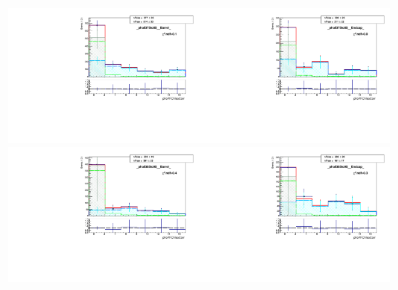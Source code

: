 \begin{figure}[htb]
  \begin{center}
   \includegraphics[width=0.45\textwidth]{../figs/figs_v11/MUON_WGamma/MCclosureWjetsPlusWg/c_TEMPL_CHISO_UNblind__phoEt75to85__Barrel__RooFit_MCclosure.pdf}\includegraphics[width=0.45\textwidth]{../figs/figs_v11/MUON_WGamma/MCclosureWjetsPlusWg/c_TEMPL_CHISO_UNblind__phoEt75to85__Endcap__RooFit_MCclosure.pdf}\\
   \includegraphics[width=0.45\textwidth]{../figs/figs_v11/MUON_WGamma/MCclosureWjetsPlusWg/c_TEMPL_CHISO_UNblind__phoEt85to95__Barrel__RooFit_MCclosure.pdf}\includegraphics[width=0.45\textwidth]{../figs/figs_v11/MUON_WGamma/MCclosureWjetsPlusWg/c_TEMPL_CHISO_UNblind__phoEt85to95__Endcap__RooFit_MCclosure.pdf}\\

\end{center}
\end{figure}

